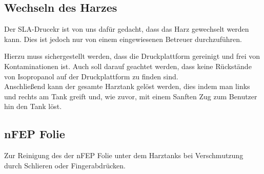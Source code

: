 \documentclass{\basedir/fablab-document}
\begin{document}
\subsection{Wechseln des Harzes}
Der SLA-Drucekr ist von uns dafür gedacht, dass das Harz gewechselt werden kann. Dies ist jedoch nur von einem eingewiesenen Betreuer durchzuführen. 

Hierzu muss sichergestellt werden, dass die Druckplattform gereinigt und frei von Kontaminationen ist. Auch soll darauf geachtet werden, dass keine Rückstände von Isopropanol auf der Druckplattform zu finden sind.\\
Anschließend kann der gesamte Harztank gelöst werden, dies indem man links und rechts am Tank greift und, wie zuvor, mit einem Sanften Zug zum Benutzer hin den Tank löst. \\

\subsection{nFEP Folie}
Zur Reinigung des der nFEP Folie unter dem Harztanks bei Verschmutzung durch Schlieren oder Fingerabdrücken.


\end{document}
